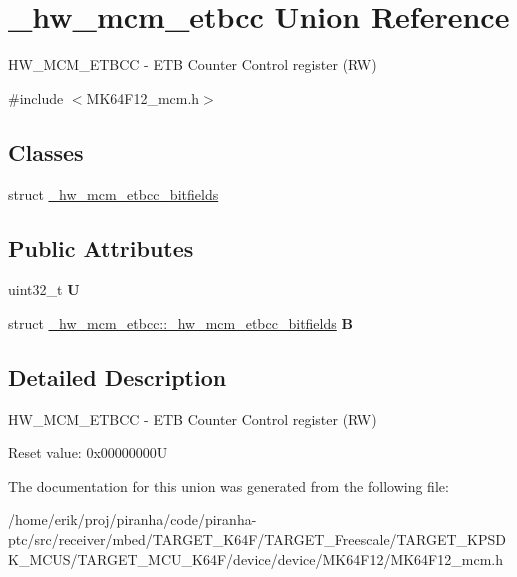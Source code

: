 \hypertarget{union__hw__mcm__etbcc}{}\section{\+\_\+hw\+\_\+mcm\+\_\+etbcc Union Reference}
\label{union__hw__mcm__etbcc}


H\+W\+\_\+\+M\+C\+M\+\_\+\+E\+T\+B\+CC -\/ E\+TB Counter Control register (RW)  




{\ttfamily \#include $<$M\+K64\+F12\+\_\+mcm.\+h$>$}

\subsection*{Classes}
\begin{DoxyCompactItemize}
\item 
struct \hyperlink{struct__hw__mcm__etbcc_1_1__hw__mcm__etbcc__bitfields}{\+\_\+hw\+\_\+mcm\+\_\+etbcc\+\_\+bitfields}
\end{DoxyCompactItemize}
\subsection*{Public Attributes}
\begin{DoxyCompactItemize}
\item 
uint32\+\_\+t {\bfseries U}\hypertarget{union__hw__mcm__etbcc_a40cc240f48472f13b90dfba169b978ef}{}\label{union__hw__mcm__etbcc_a40cc240f48472f13b90dfba169b978ef}

\item 
struct \hyperlink{struct__hw__mcm__etbcc_1_1__hw__mcm__etbcc__bitfields}{\+\_\+hw\+\_\+mcm\+\_\+etbcc\+::\+\_\+hw\+\_\+mcm\+\_\+etbcc\+\_\+bitfields} {\bfseries B}\hypertarget{union__hw__mcm__etbcc_a260393514857877826607a02f3da9345}{}\label{union__hw__mcm__etbcc_a260393514857877826607a02f3da9345}

\end{DoxyCompactItemize}


\subsection{Detailed Description}
H\+W\+\_\+\+M\+C\+M\+\_\+\+E\+T\+B\+CC -\/ E\+TB Counter Control register (RW) 

Reset value\+: 0x00000000U 

The documentation for this union was generated from the following file\+:\begin{DoxyCompactItemize}
\item 
/home/erik/proj/piranha/code/piranha-\/ptc/src/receiver/mbed/\+T\+A\+R\+G\+E\+T\+\_\+\+K64\+F/\+T\+A\+R\+G\+E\+T\+\_\+\+Freescale/\+T\+A\+R\+G\+E\+T\+\_\+\+K\+P\+S\+D\+K\+\_\+\+M\+C\+U\+S/\+T\+A\+R\+G\+E\+T\+\_\+\+M\+C\+U\+\_\+\+K64\+F/device/device/\+M\+K64\+F12/M\+K64\+F12\+\_\+mcm.\+h\end{DoxyCompactItemize}
